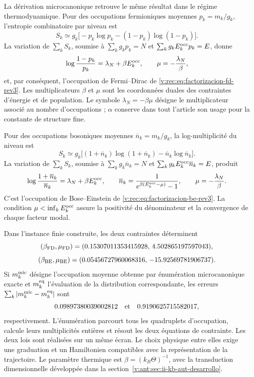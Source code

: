La dérivation microcanonique retrouve le même résultat dans le régime
thermodynamique. Pour des occupations fermioniques moyennes
\(p_k=m_k/g_k\), l’entropie combinatoire par niveau est
\begin{equation}
 S_k\simeq
 g_k\bigl[-p_k\log p_k-(1-p_k)\log(1-p_k)\bigr].
 \label{v:rec:eq:entropia-fd-nivel-rev3}
\end{equation}
La variation de \(\sum_kS_k\), soumise à
\(\sum_kg_kp_k=N\) et
\(\sum_kg_kE_k^{\rm occ}p_k=E\), donne
\begin{equation}
 \log\frac{1-p_k}{p_k}=\lambda_N+\beta E_k^{\rm occ},
 \qquad
 \mu=-\frac{\lambda_N}{\beta},
 \label{v:rec:eq:variacion-fd-rev3}
\end{equation}
et, par conséquent, l’occupation de Fermi--Dirac de
\eqref{v:rec:eq:factorizacion-fd-rev3}. Les multiplicateurs \(\beta\) et \(\mu\)
sont les coordonnées duales des contraintes d’énergie et de population.
Le symbole \(\lambda_N=-\beta\mu\) désigne le multiplicateur associé au
nombre d’occupations ; \(\alpha\) conserve dans tout l’article son usage
pour la constante de structure fine.

Pour des occupations bosoniques moyennes
\(\overline n_k=m_k/g_k\), la log-multiplicité du niveau est
\begin{equation}
 S_k\simeq
 g_k\bigl[(1+\overline n_k)\log(1+\overline n_k)
          -\overline n_k\log\overline n_k\bigr].
 \label{v:rec:eq:entropia-be-nivel-rev3}
\end{equation}
La variation de \(\sum_kS_k\), soumise à
\(\sum_kg_k\overline n_k=N\) et
\(\sum_kg_kE_k^{\rm occ}\overline n_k=E\), produit
\begin{equation}
 \log\frac{1+\overline n_k}{\overline n_k}
 =\lambda_N+\beta E_k^{\rm occ},
 \qquad
 \overline n_k
 =\frac{1}{e^{\beta(E_k^{\rm occ}-\mu)}-1},
 \qquad
 \mu=-\frac{\lambda_N}{\beta}.
 \label{v:rec:eq:variacion-be-rev3}
\end{equation}
C’est l’occupation de Bose--Einstein de
\eqref{v:rec:eq:factorizacion-be-rev3}. La condition
\(\mu<\inf_kE_k^{\rm occ}\) assure la positivité du dénominateur et la
convergence de chaque facteur modal.

Dans l’instance finie construite, les deux contraintes déterminent
\[
 (\beta_{\rm FD},\mu_{\rm FD})
 =(0.15307011353415928,\,4.502865197597043),
\]
\[
 (\beta_{\rm BE},\mu_{\rm BE})
 =(0.05456727960068316,\,-15.92569781906737).
\]
Si \(m_k^{\rm mic}\) désigne l’occupation moyenne obtenue par énumération
microcanonique exacte et \(m_k^{\rm eq}\) l’évaluation de la distribution
correspondante, les erreurs
\(\sum_k|m_k^{\rm mic}-m_k^{\rm eq}|\) sont
\[
 0.09897380039002812\quad\hbox{et}\quad
 0.9190625715582017,
\]
respectivement. L’énumération parcourt tous les quadruplets d’occupation,
calcule leurs multiplicités entières et résout les deux équations de
contrainte. Les deux lois sont réalisées sur un même écran. Le choix
physique entre elles exige une graduation et un Hamiltonien compatibles avec la
représentation de la trajectoire. Le paramètre thermique est
\(\beta=(k_B\Theta)^{-1}\), avec la transduction dimensionnelle développée dans
la section~\ref{v:ant:sec:ii-kb-aut-desarrollo}.

